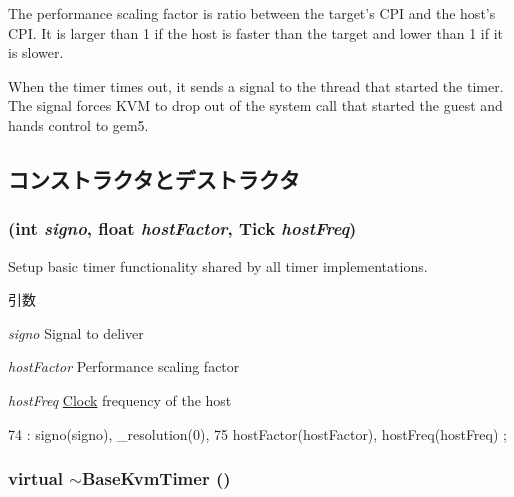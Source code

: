 The performance scaling factor is ratio between the target's CPI and the host's CPI. It is larger than 1 if the host is faster than the target and lower than 1 if it is slower.

When the timer times out, it sends a signal to the thread that started the timer. The signal forces KVM to drop out of the system call that started the guest and hands control to gem5. 

\subsection{コンストラクタとデストラクタ}
\hypertarget{classBaseKvmTimer_a0593c66dc86ef9aeff3553a78e114231}{
\subsubsection[{BaseKvmTimer}]{ (int {\em signo}, \/  float {\em hostFactor}, \/  {\bf Tick} {\em hostFreq})}}
\label{classBaseKvmTimer_a0593c66dc86ef9aeff3553a78e114231}
Setup basic timer functionality shared by all timer implementations.


\begin{DoxyParams}{引数}
\item[{\em signo}]Signal to deliver \item[{\em hostFactor}]Performance scaling factor \item[{\em hostFreq}]\hyperlink{classClock}{Clock} frequency of the host \end{DoxyParams}



\begin{DoxyCode}
74         : signo(signo), _resolution(0),
75           hostFactor(hostFactor), hostFreq(hostFreq) {};
\end{DoxyCode}
\hypertarget{classBaseKvmTimer_afbfb3a067be95a63da916f38d0beac51}{
\subsubsection[{$\sim$BaseKvmTimer}]{\setlength{\rightskip}{0pt plus 5cm}virtual $\sim${\bf BaseKvmTimer} ()}}
\label{classBaseKvmTimer_afbfb3a067be95a63da916f38d0beac51}



